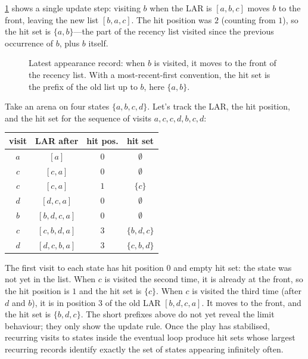 \cref{fig:lar-update} shows a single update step: visiting $b$ when the
LAR is $[a,b,c]$ moves $b$ to the front, leaving the new list
$[b,a,c]$.  The hit position was $2$ (counting from $1$), so the hit
set is $\{a,b\}$---the part of the recency list visited since the
previous occurrence of $b$, plus $b$ itself.

\begin{figure}[ht]
\centering
{}
\caption{Latest appearance record: when $b$ is visited, it moves to the
front of the recency list.  With a most-recent-first convention, the hit
set is the prefix of the old list up to $b$, here $\{a,b\}$.}
\label{fig:lar-update}
\end{figure}

\begin{example}
\label{ex:lar-walk}
Take an arena on four states $\{a,b,c,d\}$.  Let's track the LAR, the
hit position, and the hit set for the sequence of visits $a, c, c, d, b, c, d$:
\begin{center}
\begin{tabular}{c|c|c|c}
visit & LAR after & hit pos. & hit set \\ \hline
$a$ & $[a]$            & $0$ & $\emptyset$ \\
$c$ & $[c,a]$          & $0$ & $\emptyset$ \\
$c$ & $[c,a]$          & $1$ & $\{c\}$ \\
$d$ & $[d,c,a]$        & $0$ & $\emptyset$ \\
$b$ & $[b,d,c,a]$      & $0$ & $\emptyset$ \\
$c$ & $[c,b,d,a]$      & $3$ & $\{b,d,c\}$ \\
$d$ & $[d,c,b,a]$      & $3$ & $\{c,b,d\}$
\end{tabular}
\end{center}
The first visit to each state has hit position $0$ and empty hit set:
the state was not yet in the list.  When $c$ is visited the second time,
it is already at the front, so the hit position is $1$ and the hit set is $\{c\}$.
When $c$ is visited the third time (after $d$ and $b$), it is in position $3$ of
the old LAR $[b,d,c,a]$. It moves to the front, and the hit set is $\{b,d,c\}$.
The short prefixes above do not yet reveal the limit behaviour; they only show the
update rule.  Once the play has stabilised, recurring visits to states
inside the eventual loop produce hit sets whose largest recurring
records identify exactly the set of states appearing infinitely often.
\end{example}

